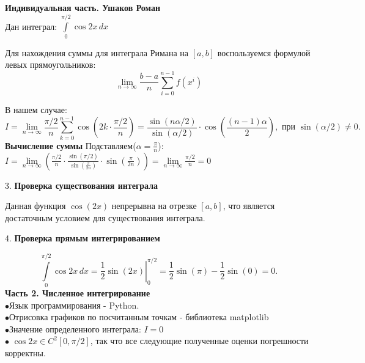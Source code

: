 \documentclass[aspectratio=169]{beamer}
\begin{document}
	\large \textbf{\textcolor{structure.fg}{Индивидуальная часть. Ушаков Роман}}\\
	Дан интеграл:
	\(\int\limits_0^{\pi/2} \cos{2x} \, dx\)
	
	Для нахождения суммы для интеграла Римана на \([a, b]\) воспользуемся формулой левых прямоугольников:
	\[\lim\limits_{n\to\infty}\frac{b-a}{n}\sum^{n-1}_{i=0}{f(x^i)}\]
	
	В нашем случае:
	\[I=\lim\limits_{n\to\infty}\frac{\pi/2}{n}\sum^{n-1}_{k=0}{\cos{(2k \cdot \frac{\pi/2}{n})}} = \frac{\sin(n \alpha /2)}{\sin(\alpha / 2)} \cdot \cos(\frac{(n-1)\alpha}{2}), \text{ при } \sin(\alpha/2) \neq 0.\]
	\textbf{Вычисление суммы}
	Подставляем(\(\alpha = \frac{\pi}{n}\)):
	\(I=\lim\limits_{n\to\infty} (\frac{\pi/2}{n} \cdot \frac{\sin(\pi/2)}{\sin(\frac{\pi}{2n})} \cdot \sin(\frac{\pi}{2n}))=\lim\limits_{n\to\infty}\frac{\pi/2}{n}=0\)
	
	
	\newpage

	
	
	3. \textbf{Проверка существования интеграла}
	
	Данная функция \(\cos(2x)\) непрерывна на отрезке \([a, b]\), что является достаточным условием для существования интеграла.
	
	\vspace{0.2cm}
	
	4. \textbf{Проверка прямым интегрированием}
	
	\[\int\limits_0^{\pi/2} \cos{2x} \, \left.dx=\frac{1}{2}\sin(2x)\right|_0^{\pi/2}=\frac{1}{2}\sin(\pi)-\frac{1}{2}\sin(0)=0.\]
	\large \textbf{\textcolor{structure.fg}{Часть 2. Численное интегрирование}}\\
	
	$\bullet$Язык программирования - Python.\\
$\bullet$Отрисовка графиков по посчитанным точкам - библиотека matplotlib\\
$\bullet$Значение определенного интеграла: \(I=0\)\\[1cm]
$\bullet$	\(\cos{2x} \in C^2[0, \pi/2]\), так что все следующие полученные оценки погрешности корректны. 
	
	\newpage
	
\end{document}
